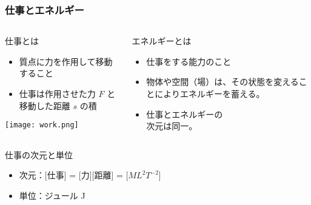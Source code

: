 \documentclass[12pt, dvipdfmx]{beamer}
\begin{document}
\begin{frame}
	\frametitle{仕事とエネルギー}
	\begin{columns}[T, onlytextwidth]
			\begin{block}{仕事とは}
				\begin{itemize}
					\item 質点に力を作用して移動すること
					\item 仕事は作用させた力 $F$ と移動した距離 $s$ の積
				\end{itemize}
				\begin{center}
					\texttt{[image: work.png]}
				\end{center}
			\end{block}
			\begin{block}{エネルギーとは}
				\begin{itemize}
					\item 仕事をする能力のこと
					\item 物体や空間（場）は、その状態を変えることによりエネルギーを蓄える。
					\item 仕事とエネルギーの\\次元は同一。
				\end{itemize}
			\end{block}
	\end{columns}
	\begin{exampleblock}{仕事の次元と単位}
		\begin{itemize}
			\item 次元：[仕事] = [力][距離] = [$ML^2T^{-2}$]
			\item 単位：ジュール J
		\end{itemize}
	\end{exampleblock}
\end{frame}
\end{document}
